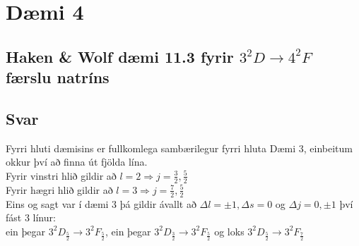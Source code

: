 \documentclass[11pt]{article}
\begin{document}
\section*{Dæmi 4}
\subsection*{Haken \& Wolf dæmi 11.3 fyrir $3^2D\rightarrow 4^2F$ færslu natríns}

\subsection*{Svar}
Fyrri hluti dæmisins er fullkomlega sambærilegur fyrri hluta Dæmi 3, einbeitum okkur því að finna út fjölda lína.\\
Fyrir vinstri hlið gildir að $l=2 \Rightarrow j = \frac{3}{2}, \frac 52$\\
Fyrir hægri hlið gildir að $l=3 \Rightarrow j = \frac 72, \frac 52$\\
Eins og sagt var í dæmi 3 þá gildir ávallt að $\Delta l = \pm 1, \Delta s = 0$ og $\Delta j = 0,\pm 1$ því fást 3 línur:\\
ein þegar $3^2D_\frac{5}{2} \rightarrow 3^2F_\frac{5}{2}$, ein þegar $3^2D_\frac{3}{2} \rightarrow 3^2F_\frac{5}{2}$ og loks $3^2D_\frac{5}{2} \rightarrow 3^2F_\frac{7}{2}$
\end{document}
